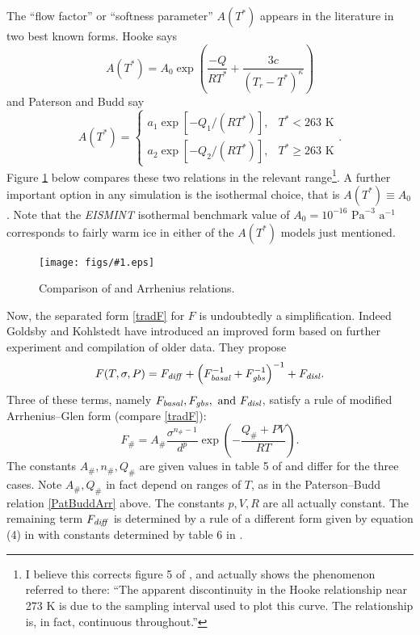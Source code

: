 \documentclass[12pt,final]{amsart}%
\theoremstyle{plain}
\theoremstyle{definition}
\theoremstyle{remark}
\newcommand{\regfigure}[2]{\texttt{[image: figs/\#1.eps]}}
\begin{document}
The ``flow factor'' or ``softness parameter'' $A(T^*)$ appears in the literature in two best known forms.  Hooke \citep{Hooke} says
    $$A(T^*) = A_0 \exp\left(\frac{-Q}{R T^*} + \frac{3c}{(T_r - T^*)^\kappa}\right)$$
and Paterson and Budd \citep{PatersonBudd} say
\begin{equation}\label{PatBuddArr}
A(T^*) = \begin{cases} a_1 \exp\left[-Q_1/(R T^*)\right], &T^*<263 \text{ K} \\
a_2 \exp\left[-Q_2/(R T^*)\right], &T^*\ge 263 \text{ K} \end{cases}.
\end{equation}
Figure \ref{arrfig} below compares these two relations in the relevant range\footnote{I believe this corrects figure 5 of \citep{PayneBaldwin}, and actually shows the phenomenon referred to there: ``The apparent discontinuity in the Hooke relationship near 273 K is due to the sampling interval used to plot this curve.  The relationship is, in fact, continuous throughout.''}.  A further important option in any simulation is the isothermal choice, that is $A(T^*)\equiv A_0$.  Note that the \emph{EISMINT} isothermal benchmark \citep{EISMINT96} value of $A_0=10^{-16}$ $\text{Pa}^{-3}$ $\text{a}^{-1}$ corresponds to fairly warm ice in either of the $A(T^*)$ models just mentioned.
\begin{figure}[ht]
\regfigure{arrfig}{3}
\caption{Comparison of \citet{Hooke} and \citet{PatersonBudd} Arrhenius relations.}
\label{arrfig}
\end{figure}

Now, the separated form \eqref{tradF} for $F$ is undoubtedly a simplification.  Indeed Goldsby and Kohlstedt \citep{GoldsbyKohlstedt} have introduced an improved form based on further experiment and compilation of older data.  They propose
\begin{equation}\label{GKF}
F(T,\sigma,P)=F_{\text{\emph{diff}}} + \left(F_{\text{\emph{basal}}}^{-1} + F_{\text{\emph{gbs}}}^{-1}\right)^{-1} +F_{\text{\emph{disl}}}.
\end{equation}
Three of these terms, namely  $F_{\text{\emph{basal}}}, F_{\text{\emph{gbs}}}, \text{ and } F_{\text{\emph{disl}}}$, satisfy a rule of modified Arrhenius--Glen form (compare \eqref{tradF}):
    $$F_{\#}=A_{\#} \frac{\sigma^{n_{\#}-1}}{d^p} \exp\left(-\frac{Q_{\#}+PV}{RT}\right).$$
The constants $A_{\#},n_{\#},Q_{\#}$ are given values in table 5 of \citep{GoldsbyKohlstedt} and differ for the three cases.  Note $A_{\#},Q_{\#}$ in fact depend on ranges of $T$, as in the Paterson--Budd relation \eqref{PatBuddArr} above.  The constants $p, V, R$ are all actually constant.  The remaining term $F_{\text{\emph{diff}}}$ is determined by a rule of a different form given by equation (4) in \citep{GoldsbyKohlstedt} with constants determined by table 6 in \citep{GoldsbyKohlstedt}.
\end{document}
